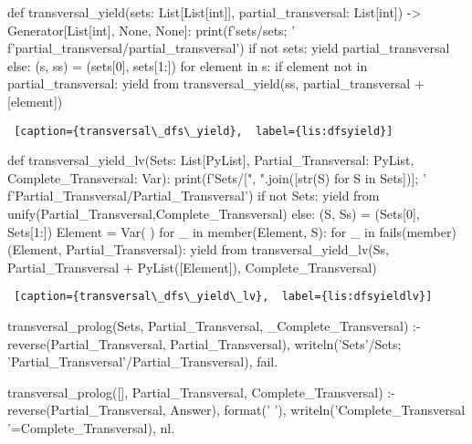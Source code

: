 \begin{center}
\begin{minipage}{\linewidth}
\begin{python}[numbers=left]
def transversal_yield(sets: List[List[int]], 
                      partial_transversal: List[int]) 
                      -> Generator[List[int], None, None]:
  print(f'sets/{sets}; '
        f'partial_transversal/{partial_transversal}')
  if not sets:
    yield partial_transversal
  else:
    (s, ss) = (sets[0], sets[1:])
    for element in s:
      if element not in partial_transversal:
        yield from transversal_yield(ss, partial_transversal + [element])
            
\end{python}
\begin{lstlisting} [caption={transversal\_dfs\_yield},  label={lis:dfsyield}]
\end{lstlisting}
\end{minipage}

\begin{minipage}{\linewidth}
\begin{python}[numbers=left]
def transversal_yield_lv(Sets: List[PyList], 
                         Partial_Transversal: PyList,
                         Complete_Transversal: Var):
  print(f'Sets/[{", ".join([str(S) for S in Sets])}]; '
        f'Partial_Transversal/{Partial_Transversal}')
  if not Sets:
    yield from unify(Partial_Transversal,Complete_Transversal)
  else:
    (S, Ss) = (Sets[0], Sets[1:])
    Element = Var( )
    for _ in member(Element, S):
      for _ in fails(member)(Element, Partial_Transversal):
        yield from 
          transversal_yield_lv(Ss, Partial_Transversal + PyList([Element]), 
                                   Complete_Transversal)
    \end{python}
    \begin{lstlisting} [caption={transversal\_dfs\_yield\_lv},  label={lis:dfsyieldlv}]
    \end{lstlisting}
\end{minipage}

\begin{minipage}{\linewidth}
\begin{python}[numbers=left]
transversal_prolog(Sets, 
                   Partial_Transversal, 
                   _Complete_Transversal) :-
    reverse(Partial_Transversal, Partial_Transversal),
    writeln('Sets'/Sets;
            'Partial_Transversal'/Partial_Transversal), 
    fail.

transversal_prolog([], 
                   Partial_Transversal, 
                   Complete_Transversal) :-
    reverse(Partial_Transversal, Answer),
    format('                                  '),
    writeln('Complete_Transversal '=Complete_Transversal), nl.


\end{python}
\end{minipage}
\end{center}
